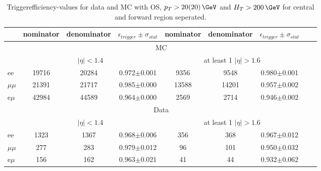 
\begin{table}[hbp] \caption{Triggerefficiency-values for data and MC with OS, $p_T>20(20)\,\GeV$ and $H_T>200\,\GeV$ for central and forward region seperated.} 
\centering 
\renewcommand{\arraystretch}{1.2} 
\begin{tabular}{|l|c|c|c|c|c|c|c|c|}     
\hline    
 & nominator & denominator & $\epsilon_{trigger} \pm \sigma_{stat}$ &  nominator & denominator & $\epsilon_{trigger} \pm \sigma_{stat}$  \\    
\hline\hline
& \multicolumn{6}{|c|}{MC} \\
\hline
&  \multicolumn{3}{|c|}{$|\eta|<1.4$ } & \multicolumn{3}{|c|}{ at least 1 $|\eta| > 1.6$ } \\
\hline 
ee & 19716 & 20284 & 0.972$\pm$0.001 & 9356 & 9548 & 0.980$\pm$0.001 \\
$\mu\mu$ & 21391 & 21717 & 0.985$\pm$0.000 & 13588 & 14201 & 0.957$\pm$0.002 \\
e$\mu$ & 42984 & 44589 & 0.964$\pm$0.000 & 2569 & 2714 & 0.946$\pm$0.002 \\
    
    \hline 
&\multicolumn{6}{|c|}{Data} \\
\hline
&  \multicolumn{3}{|c|}{$|\eta|<1.4$ } & \multicolumn{3}{|c|}{ at least 1 $|\eta| > 1.6$ }\\
\hline
ee & 1323 & 1367 & 0.968$\pm$0.006 & 356 & 368 & 0.967$\pm$0.012 \\
$\mu\mu$ & 277 & 283 & 0.979$\pm$0.012 & 96 & 101 & 0.950$\pm$0.032 \\
e$\mu$ & 156 & 162 & 0.963$\pm$0.021 & 41 & 44 & 0.932$\pm$0.062 \\
 
 \hline     
\end{tabular}  
\label{tab:EffValues_Seperated}
\end{table}
